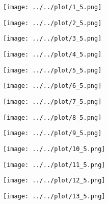 \documentclass{article}
\begin{document}
\begin{figure}[H]
	\begin{subfigure}[h]{0.2\textwidth}
		\texttt{[image: ../../plot/1\_5.png]}
	\end{subfigure}
	\begin{subfigure}[h]{0.2\textwidth}
		\texttt{[image: ../../plot/2\_5.png]}
	\end{subfigure}
	\begin{subfigure}[h]{0.2\textwidth}
		\texttt{[image: ../../plot/3\_5.png]}
	\end{subfigure}
	\begin{subfigure}[h]{0.2\textwidth}
		\texttt{[image: ../../plot/4\_5.png]}
	\end{subfigure}
	\begin{subfigure}[h]{0.2\textwidth}
		\texttt{[image: ../../plot/5\_5.png]}
	\end{subfigure}
	\begin{subfigure}[h]{0.2\textwidth}
		\texttt{[image: ../../plot/6\_5.png]}
	\end{subfigure}
	\begin{subfigure}[h]{0.2\textwidth}
		\texttt{[image: ../../plot/7\_5.png]}
	\end{subfigure}
	\begin{subfigure}[h]{0.2\textwidth}
		\texttt{[image: ../../plot/8\_5.png]}
	\end{subfigure}
	\begin{subfigure}[h]{0.2\textwidth}
		\texttt{[image: ../../plot/9\_5.png]}
	\end{subfigure}
	\begin{subfigure}[h]{0.2\textwidth}
		\texttt{[image: ../../plot/10\_5.png]}
	\end{subfigure}
	\begin{subfigure}[h]{0.2\textwidth}
		\texttt{[image: ../../plot/11\_5.png]}
	\end{subfigure}
	\begin{subfigure}[h]{0.2\textwidth}
		\texttt{[image: ../../plot/12\_5.png]}
	\end{subfigure}
	\begin{subfigure}[h]{0.2\textwidth}
		\texttt{[image: ../../plot/13\_5.png]}
	\end{subfigure}
	\begin{subfigure}[h]{0.2\textwidth}

\end{subfigure}
\end{figure}
\end{document}
